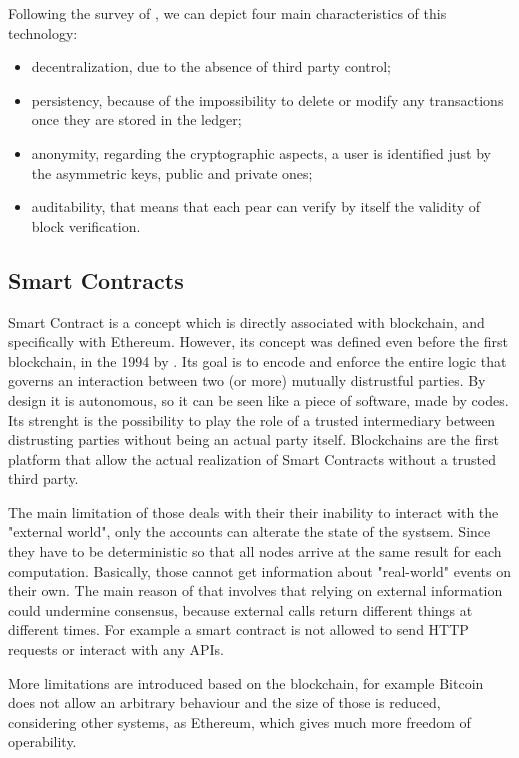 Following the survey of \citet{BlockChain1}, we can depict four main characteristics of this technology:
\begin{itemize}
    \item decentralization, due to the absence of third party control;
    \item persistency, because of the impossibility to delete or modify any transactions once they are stored in the ledger;
    \item anonymity, regarding the cryptographic aspects, a user is identified just by the asymmetric keys, public and private ones;    
    \item auditability, that means that each pear can verify by itself the validity of block verification.
\end{itemize}


\subsection{Smart Contracts}

Smart Contract is a concept which is directly associated with blockchain, and specifically with Ethereum.
However, its concept was defined even before the first blockchain, in the 1994 by \citet{SmartContractDef}.
Its goal is to encode and enforce the entire logic that governs an interaction
between two (or more) mutually distrustful parties. By design it is autonomous, so it can be seen like a piece of software, made by codes.
Its strenght is the possibility to play the role of a trusted intermediary between distrusting parties
without being an actual party itself.
Blockchains are the first platform that allow the actual realization of
Smart Contracts without a trusted third party. 

The main limitation of those deals with their their inability to interact with the "external world", 
only the accounts can alterate the state of the systsem. 
Since they have to be deterministic so that all nodes arrive at the same result for each computation. 
Basically, those cannot get information about "real-world" events on their own. 
The main reason of that involves that relying on external information could undermine consensus, 
because external calls return different things at different times. 
For example a smart contract is not allowed to send HTTP requests or interact with any APIs.

More limitations are introduced based on the blockchain, for example Bitcoin does not allow an arbitrary behaviour and the size of those is reduced, 
considering other systems, as Ethereum, which gives much more freedom of operability.

